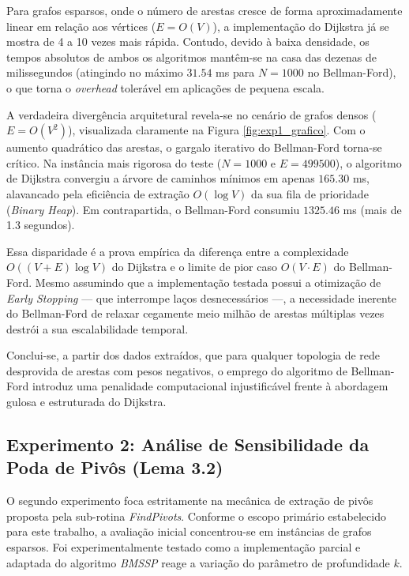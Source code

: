 \documentclass[10pt,a4paper]{article}
\begin{document}
Para grafos esparsos, onde o número de arestas cresce de forma aproximadamente linear em relação aos vértices ($E = O(V)$), a implementação do Dijkstra já se mostra de 4 a 10 vezes mais rápida. Contudo, devido à baixa densidade, os tempos absolutos de ambos os algoritmos mantêm-se na casa das dezenas de milissegundos (atingindo no máximo $31.54$ ms para $N=1000$ no Bellman-Ford), o que torna o \textit{overhead} tolerável em aplicações de pequena escala.

A verdadeira divergência arquitetural revela-se no cenário de grafos densos ($E = O(V^2)$), visualizada claramente na Figura \ref{fig:exp1_grafico}. Com o aumento quadrático das arestas, o gargalo iterativo do Bellman-Ford torna-se crítico. Na instância mais rigorosa do teste ($N=1000$ e $E=499500$), o algoritmo de Dijkstra convergiu a árvore de caminhos mínimos em apenas $165.30$ ms, alavancado pela eficiência de extração $O(\log V)$ da sua fila de prioridade (\textit{Binary Heap}). Em contrapartida, o Bellman-Ford consumiu $1325.46$ ms (mais de 1.3 segundos). 

Essa disparidade é a prova empírica da diferença entre a complexidade $O((V+E)\log V)$ do Dijkstra e o limite de pior caso $O(V \cdot E)$ do Bellman-Ford. Mesmo assumindo que a implementação testada possui a otimização de \textit{Early Stopping} — que interrompe laços desnecessários —, a necessidade inerente do Bellman-Ford de relaxar cegamente meio milhão de arestas múltiplas vezes destrói a sua escalabilidade temporal. 

Conclui-se, a partir dos dados extraídos, que para qualquer topologia de rede desprovida de arestas com pesos negativos, o emprego do algoritmo de Bellman-Ford introduz uma penalidade computacional injustificável frente à abordagem gulosa e estruturada do Dijkstra.

\subsection{Experimento 2: Análise de Sensibilidade da Poda de Pivôs (Lema 3.2)}

O segundo experimento foca estritamente na mecânica de extração de pivôs proposta pela sub-rotina \textit{FindPivots}. Conforme o escopo primário estabelecido para este trabalho, a avaliação inicial concentrou-se em instâncias de grafos esparsos. Foi experimentalmente testado como a implementação parcial e adaptada do algoritmo \textit{BMSSP} reage a variação do parâmetro de profundidade $k$.
\end{document}
